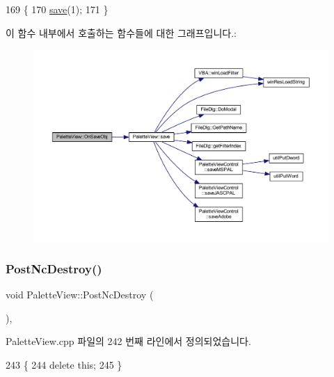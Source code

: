 \begin{DoxyCode}
169 \{
170   \mbox{\hyperlink{class_palette_view_a107b71060221c9d44bdf0d38ca77c689}{save}}(1);
171 \}
\end{DoxyCode}
이 함수 내부에서 호출하는 함수들에 대한 그래프입니다.\+:
\nopagebreak
\begin{figure}[H]
\begin{center}
\leavevmode
\includegraphics[width=350pt]{class_palette_view_a1a09199a2ab1045bbbcef736d05296c1_cgraph}
\end{center}
\end{figure}
\mbox{\label{class_palette_view_a04d420d2e5e101622394b6da9bcd4a52}} 
\subsubsection{\texorpdfstring{Post\+Nc\+Destroy()}{PostNcDestroy()}}
{\footnotesize\ttfamily void Palette\+View\+::\+Post\+Nc\+Destroy (\begin{DoxyParamCaption}{ }\end{DoxyParamCaption})\hspace{0.3cm}{\ttfamily [protected]}, {\ttfamily [virtual]}}



Palette\+View.\+cpp 파일의 242 번째 라인에서 정의되었습니다.


\begin{DoxyCode}
243 \{
244   \textcolor{keyword}{delete} \textcolor{keyword}{this};
245 \}
\end{DoxyCode}
\mbox{\label{class_palette_view_a107b71060221c9d44bdf0d38ca77c689}} 
